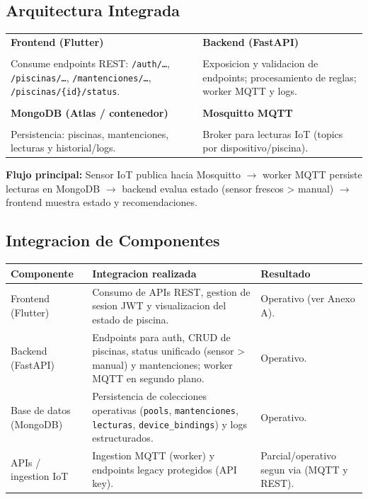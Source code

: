 \documentclass[11pt, a4paper]{article}
\begin{document}
\subsection{Arquitectura Integrada}
\begin{center}
\begin{tabular}{@{}l l@{}}
  \textbf{Frontend (Flutter)} & \textbf{Backend (FastAPI)} \\
  \\
  \scriptsize Consume endpoints REST: \texttt{/auth/\ldots}, \texttt{/piscinas/\ldots}, \texttt{/mantenciones/\ldots}, \texttt{/piscinas/\{id\}/status}. & \scriptsize Exposicion y validacion de endpoints; procesamiento de reglas; worker MQTT y logs. \\
  \\
  \textbf{MongoDB (Atlas / contenedor)} & \textbf{Mosquitto MQTT} \\
  \\
  \scriptsize Persistencia: piscinas, mantenciones, lecturas y historial/logs. & \scriptsize Broker para lecturas IoT (topics por dispositivo/piscina). \\
\end{tabular}
\end{center}

\vspace{0.5em}
\noindent\textbf{Flujo principal:} Sensor IoT publica hacia Mosquitto $\rightarrow$ worker MQTT persiste lecturas en MongoDB $\rightarrow$ backend evalua estado (sensor frescos > manual) $\rightarrow$ frontend muestra estado y recomendaciones.

\subsection{Integracion de Componentes}
\begin{longtable}{@{} p{2.6cm} p{5.4cm} p{5.1cm} @{}}
  \toprule
  \textbf{Componente} & \textbf{Integracion realizada} & \textbf{Resultado} \\
  \midrule
  Frontend (Flutter) & Consumo de APIs REST, gestion de sesion JWT y visualizacion del estado de piscina. & Operativo (ver Anexo A). \\
  \midrule
  Backend (FastAPI) & Endpoints para auth, CRUD de piscinas, status unificado (sensor > manual) y mantenciones; worker MQTT en segundo plano. & Operativo. \\
  \midrule
  Base de datos (MongoDB) & Persistencia de colecciones operativas (\texttt{pools}, \texttt{mantenciones}, \texttt{lecturas}, \texttt{device\_bindings}) y logs estructurados. & Operativo. \\
  \midrule
  APIs / ingestion IoT & Ingestion MQTT (worker) y endpoints legacy protegidos (API key). & Parcial/operativo segun via (MQTT y REST). \\
  \bottomrule
\end{longtable}
\end{document}
